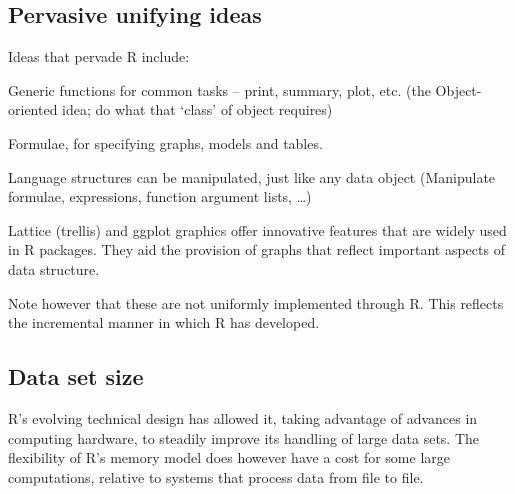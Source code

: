 \subsection*{Pervasive unifying ideas}
Ideas that pervade R include:\\[-8pt]
\begin{list}{}{\setlength{\itemsep}{1pt} \setlength{\parsep}{1pt}}
\item[] Generic functions for common tasks -- print, summary, plot, etc.
(the Object-oriented idea; do what that `class' of object requires)

\item[] Formulae, for specifying graphs, models and tables.

\item[] Language structures can be manipulated, just like any
data object (Manipulate formulae, expressions, function argument
lists, \dots)

\item[] Lattice (trellis) and ggplot graphics offer innovative
  features that are widely used in R packages.  They aid the provision
  of graphs that reflect important aspects of data structure.

\end{list}
Note however that these are not uniformly implemented through R.
This reflects the incremental manner in which R has developed.

\subsection*{Data set size}
R's evolving technical design has allowed it, taking advantage of advances in computing hardware,
to steadily improve its handling of large data sets. The flexibility
of R's memory model does however have a cost for some large computations, relative to systems
that process data from file to file.

